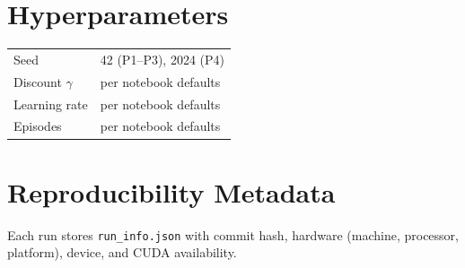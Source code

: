 \documentclass[10pt,conference]{IEEEtran}
\begin{document}
\appendices
\section{Hyperparameters}
\begin{table}[h]
\centering
\begin{tabular}{@{}l l@{}}
\toprule
Seed & 42 (P1--P3), 2024 (P4) \\
Discount $\gamma$ & per notebook defaults \\
Learning rate & per notebook defaults \\
Episodes & per notebook defaults \\
\bottomrule
\end{tabular}
\end{table}

\section{Reproducibility Metadata}
Each run stores \texttt{run\_info.json} with commit hash, hardware (machine, processor, platform), device, and CUDA availability.



\end{document}
